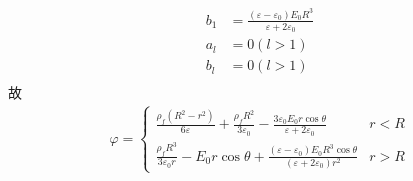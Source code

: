 \documentclass{phyasgn}
\begin{document}
\begin{sol}[5]
\begin{align*}
    b_1&=\frac{(\varepsilon-\varepsilon_0)E_0R^3}{\varepsilon+2\varepsilon_0}\\
    a_l&=0(l>1)\\
    b_l&=0(l>1)\\
  \end{align*}
  故
  \begin{align*}
    \varphi=\left\{\begin{matrix}
      \frac{\rho_f(R^2-r^2)}{6\varepsilon}+\frac{\rho_fR^2}{3\varepsilon_0}-\frac{3\varepsilon_0E_0r\cos\theta}{\varepsilon+2\varepsilon_0}&r<R\\
      \frac{\rho_fR^3}{3\varepsilon_0r}-E_0r\cos\theta+\frac{(\varepsilon-\varepsilon_0)E_0R^3\cos\theta}{(\varepsilon+2\varepsilon_0)r^2}&r>R
    \end{matrix}\right.
  \end{align*}
\end{sol} 
\end{document}
